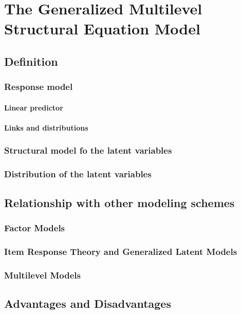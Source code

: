 \chapter{The Generalized Multilevel Structural Equation Model}


\section{Definition}

\subsection{Response model}

\subsubsection{Linear predictor}

\subsubsection{Links and distributions}

\subsection{Structural model fo the latent variables}

\subsection{Distribution of the latent variables}



\section{Relationship with other modeling schemes}

\subsection{Factor Models}

\subsection{Item Response Theory and Generalized Latent Models}

\subsection{Multilevel Models}



\section{Advantages and Disadvantages}